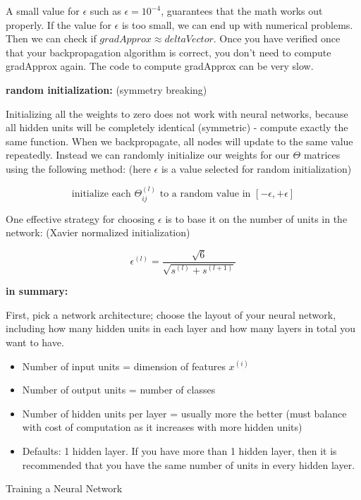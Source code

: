 \documentclass{article}
\begin{document}
\noindent A small value for \(\epsilon\) such as \(\epsilon = 10^{-4}\), guarantees that the math works out properly. If the value for \(\epsilon\) is too small, we can end up with numerical problems. Then we can check if \(gradApprox \approx deltaVector\). Once you have verified once that your backpropagation algorithm is correct, you don't need to compute gradApprox again. The code to compute gradApprox can be very slow.
 
\bigskip

\noindent \textbf{random initialization:} (symmetry breaking)

\noindent Initializing all the weights to zero does not work with neural networks, because all hidden units will be completely identical (symmetric) - compute exactly the same function. When we backpropagate, all nodes will update to the same value repeatedly. Instead we can randomly initialize our weights for our \(\Theta\) matrices using the following method: (here \(\epsilon\) is a value selected for random initialization)

\[\text{initialize each } \Theta_{ij}^{(l)} \text{ to a random value in } [-\epsilon, +\epsilon]\]

\noindent One effective strategy for choosing \(\epsilon\) is to base it on the number of units in the network: (Xavier normalized initialization)

\[\epsilon^{(l)} = \frac{\sqrt{6}}{\sqrt{s^{(l)} + s^{(l + 1)}}}\]

\noindent \textbf{in summary:}

\noindent First, pick a network architecture; choose the layout of your neural network, including how many hidden units in each layer and how many layers in total you want to have.

\begin{itemize}
  \item Number of input units = dimension of features \(x^{(i)}\)
  \item Number of output units = number of classes
  \item Number of hidden units per layer = usually more the better (must balance with cost of computation as it increases with more hidden units)
  \item Defaults: 1 hidden layer. If you have more than 1 hidden layer, then it is recommended that you have the same number of units in every hidden layer.
\end{itemize}

\noindent Training a Neural Network
\end{document}
